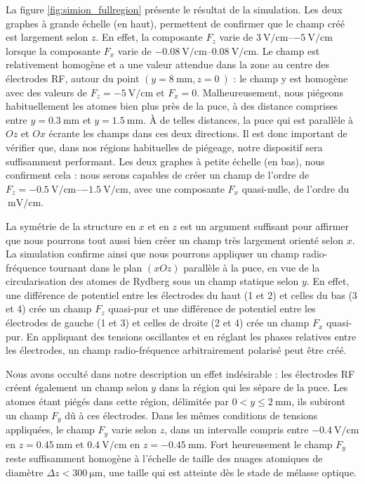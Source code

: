 La figure \eqref{fig:simion_fullregion} présente le résultat de la simulation.
Les deux graphes à grande échelle (en haut), permettent de confirmer que le champ créé est largement selon $z$.
En effet, la composante $F_z$ varie de $\SIrange{+3}{-5}{\V/\cm}$ lorsque la composante $F_x$ varie de $\SIrange{-0.08}{+0.08}{\V/\cm}$.
Le champ est relativement homogène et a une valeur attendue dans la zone au centre des électrodes RF, autour du point $(y= \SI{8}{\mm}, z=\SI{0}{})$ : le champ y est homogène avec des valeurs de $F_z=\SI{-5}{\V/\cm}$ et $F_x=0$.
Malheureusement, nous piégeons habituellement les atomes bien plus près de la puce, à des distance comprises entre $y=\SI{0.3}{\mm}$ et $y=\SI{1.5}{\mm}$.
\`A de telles distances, la puce qui est parallèle à $Oz$ et $Ox$ écrante les champs dans ces deux directions.
Il est donc important de vérifier que, dans nos régions habituelles de piégeage, notre dispositif sera suffisamment performant.
Les deux graphes à petite échelle (en bas), nous confirment cela :
nous serons capables de créer un champ de l'ordre de $F_z=\SIrange{-0.5}{-1.5}{\V/\cm}$, avec une composante $F_x$ quasi-nulle, de l'ordre du $\SI{}{\milli\V/\cm}$.

La symétrie de la structure en $x$ et en $z$ est un argument suffisant pour affirmer que nous pourrons tout aussi bien créer un champ %
très largement orienté selon $x$.
La simulation confirme ainsi que nous pourrons appliquer un champ radio-fréquence tournant dans le plan $(xOz)$ parallèle à la puce, en vue de la circularisation des atomes de Rydberg sous un champ statique selon $y$.
En effet, une différence de potentiel entre les électrodes du haut (1 et 2) et celles du bas (3 et 4) crée un champ $F_z$ quasi-pur et une différence de potentiel entre les électrodes de gauche (1 et 3) et celles de droite (2 et 4) crée un champ $F_x$ quasi-pur.
En appliquant des tensions oscillantes et en réglant les phases relatives entre les électrodes, un champ radio-fréquence arbitrairement polarisé peut être créé.

Nous avons occulté dans notre description un effet indésirable :
les électrodes RF créent également un champ selon $y$ dans la région qui les sépare de la puce.
Les atomes étant piégés dans cette région, délimitée par $\num{0} < y \leq \SI{2}{\mm}$, ils subiront un champ $F_y$ dû à ces électrodes.
Dans les mêmes conditions de tensions appliquées, le champ $F_y$ varie selon $z$, dans un intervalle compris entre $\SI{-0.4}{\V/\cm}$ en $z=\SI{+0.45}{\mm}$ et $\SI{+0.4}{\V/\cm}$ en $z=\SI{-0.45}{\mm}$.
Fort heureusement le champ $F_y$ reste suffisamment homogène à l'échelle de taille des nuages atomiques de diamètre $\Delta z < \SI{300}{\um}$, une taille qui est atteinte dès le stade de mélasse optique.

